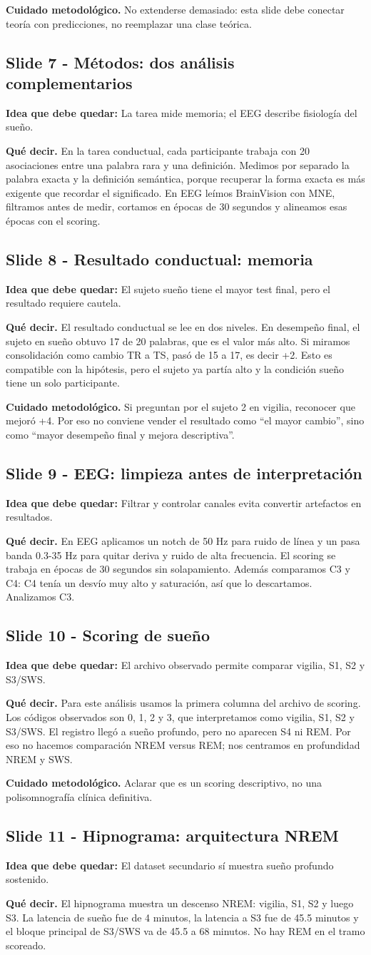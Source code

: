 \documentclass[11pt,a4paper]{article}
\newcommand{\slidehead}[3]{%
\subsection*{Slide #1 - #2}\textbf{Idea que debe quedar:} #3\par}
\newcommand{\decir}{\textbf{Qué decir.} }
\newcommand{\cuidado}{\textbf{Cuidado metodológico.} }
\begin{document}
\cuidado No extenderse demasiado: esta slide debe conectar teoría con predicciones, no reemplazar una clase teórica.

\slidehead{7}{Métodos: dos análisis complementarios}{La tarea mide memoria; el EEG describe fisiología del sueño.}
\decir En la tarea conductual, cada participante trabaja con 20 asociaciones entre una palabra rara y una definición. Medimos por separado la palabra exacta y la definición semántica, porque recuperar la forma exacta es más exigente que recordar el significado. En EEG leímos BrainVision con MNE, filtramos antes de medir, cortamos en épocas de 30 segundos y alineamos esas épocas con el scoring.

\slidehead{8}{Resultado conductual: memoria}{El sujeto sueño tiene el mayor test final, pero el resultado requiere cautela.}
\decir El resultado conductual se lee en dos niveles. En desempeño final, el sujeto en sueño obtuvo 17 de 20 palabras, que es el valor más alto. Si miramos consolidación como cambio TR a TS, pasó de 15 a 17, es decir +2. Esto es compatible con la hipótesis, pero el sujeto ya partía alto y la condición sueño tiene un solo participante.

\cuidado Si preguntan por el sujeto 2 en vigilia, reconocer que mejoró +4. Por eso no conviene vender el resultado como ``el mayor cambio'', sino como ``mayor desempeño final y mejora descriptiva''.

\slidehead{9}{EEG: limpieza antes de interpretación}{Filtrar y controlar canales evita convertir artefactos en resultados.}
\decir En EEG aplicamos un notch de 50 Hz para ruido de línea y un pasa banda 0.3-35 Hz para quitar deriva y ruido de alta frecuencia. El scoring se trabaja en épocas de 30 segundos sin solapamiento. Además comparamos C3 y C4: C4 tenía un desvío muy alto y saturación, así que lo descartamos. Analizamos C3.

\slidehead{10}{Scoring de sueño}{El archivo observado permite comparar vigilia, S1, S2 y S3/SWS.}
\decir Para este análisis usamos la primera columna del archivo de scoring. Los códigos observados son 0, 1, 2 y 3, que interpretamos como vigilia, S1, S2 y S3/SWS. El registro llegó a sueño profundo, pero no aparecen S4 ni REM. Por eso no hacemos comparación NREM versus REM; nos centramos en profundidad NREM y SWS.

\cuidado Aclarar que es un scoring descriptivo, no una polisomnografía clínica definitiva.

\slidehead{11}{Hipnograma: arquitectura NREM}{El dataset secundario sí muestra sueño profundo sostenido.}
\decir El hipnograma muestra un descenso NREM: vigilia, S1, S2 y luego S3. La latencia de sueño fue de 4 minutos, la latencia a S3 fue de 45.5 minutos y el bloque principal de S3/SWS va de 45.5 a 68 minutos. No hay REM en el tramo scoreado.
\end{document}
